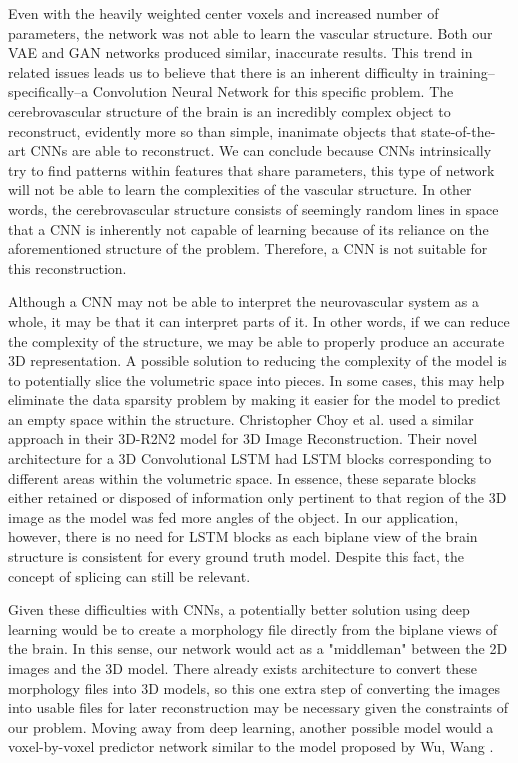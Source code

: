 \documentclass[conference, 10pt]{IEEEtran}
\begin{document}
Even with the heavily weighted center voxels and increased number of parameters,
the network was not able to learn the vascular structure. Both our VAE and GAN
networks produced similar, inaccurate results. This trend in related issues
leads us to believe that there is an inherent difficulty in training--
specifically--a Convolution Neural Network for this specific problem. The
cerebrovascular structure of the brain is an incredibly complex object to
reconstruct, evidently more so than simple, inanimate objects that
state-of-the-art CNNs are able to reconstruct. We can conclude because CNNs 
intrinsically try to find patterns within features that share parameters, this
type of network will not be able to learn the complexities of the vascular
structure. In other words, the cerebrovascular structure consists of seemingly 
random lines in space that a CNN is inherently not capable of learning because 
of its reliance on the aforementioned structure of the problem. Therefore, a 
CNN is not suitable for this reconstruction.

Although a CNN may not be able to interpret the neurovascular system as a whole, it may be that it can interpret parts of it. In other words, if we can reduce the complexity of the structure, we may be able to properly produce an accurate 3D representation. A possible solution to reducing the complexity of the model is to potentially slice the volumetric space into pieces. In some cases, this may help eliminate the data sparsity problem by making it easier for the model to predict an empty space within the structure. Christopher Choy et al. used a similar approach in their 3D-R2N2 model for 3D Image Reconstruction. Their novel architecture for a 3D Convolutional LSTM had LSTM blocks corresponding to different areas within the volumetric space. In essence, these separate blocks either retained or disposed of information only pertinent to that region of the 3D image as the model was fed more angles of the object. In our application, however, there is no need for LSTM blocks as each biplane view of the brain structure is consistent for every ground truth model. Despite this fact, the concept of splicing can still be relevant.

Given these difficulties with CNNs, a potentially better solution using deep
learning would be to create a morphology file directly from the biplane views
of the brain. In this sense, our network would act as a "middleman" between
the 2D images and the 3D model. There already exists architecture to convert 
these morphology files into 3D models, so this one extra step of converting
the images into usable files for later reconstruction may be necessary given
the constraints of our problem. Moving away from deep learning, another possible
model would a voxel-by-voxel predictor network similar to the model proposed by 
Wu, Wang \cite{ML approach}.
\end{document}
